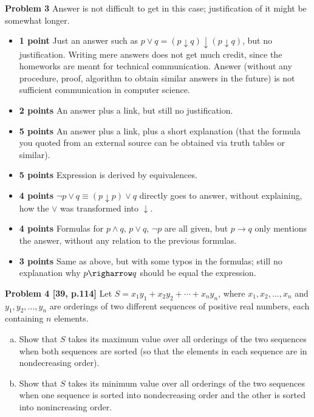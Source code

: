 \documentclass[jou]{apa6}
\begin{document}
\begin{enumerete}
\begin{enumerete}
\vspace{2ex}
{\bf Problem 3} 
Answer is not difficult to get in this case; justification of it might be somewhat
longer. 
\begin{itemize}
\item {\bf 1 point} Just an answer such as
$p \vee q = (p \downarrow q) \downarrow (p \downarrow q)$, but no justification.
Writing mere answers does not get much credit, since the homeworks
are meant for technical communication. Answer (without any procedure, proof, 
algorithm to obtain similar answers in the future) 
is not sufficient communication in computer science.
\item {\bf 2 points} An answer plus a link, but still no justification. 
\item {\bf 5 points} An answer plus a link, plus a short explanation (that the formula you quoted from 
an external source can be obtained via truth tables or similar). 
\item {\bf 5 points} Expression is derived by equivalences.
\item {\bf 4 points} $\neg p \vee q \equiv (p \downarrow p) \vee q$ directly goes to answer, 
without explaining, how the $\vee$ was transformed into $\downarrow$.
\item {\bf 4 points} Formulas for $p \wedge q$, $p \vee q$, $\neg p$ are all given, 
but $p \rightarrow q$ only mentions the answer, without any relation to the previous formulas.
\item {\bf 3 points} Same as above, but with some typos in the formulas; still no explanation 
why $p \righarrow q$ should be equal the expression.
\end{itemize}




\vspace{2ex}
{\bf Problem 4 [39, p.114]} 
Let $S = x_1y_1 + x_2y_2 + \cdots + x_ny_n$, where $x_1,x_2,\ldots,x_n$
and $y_1,y_2,\ldots,y_n$ are orderings of two different sequences
of positive real numbers, each containing $n$ elements.
\begin{enumerate}[(a)]
\item Show that $S$ takes its maximum value over all orderings of the two 
sequences when both sequences are sorted (so that the elements in each 
sequence are in nondecreasing order). 
\item Show that $S$ takes its minimum value over all orderings of the two 
sequences when one sequence is sorted into nondecreasing order and the other 
is sorted into nonincreasing order.
\end{enumerate}


\end{enumerete}
\end{enumerete}
\end{document}
